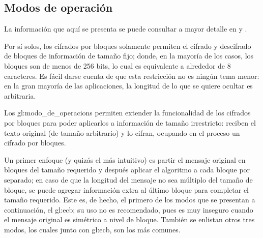 %
%

\subsection{Modos de operación}
\label{sec:modos}

La información que aquí se presenta se puede consultar a mayor detalle en
\cite{modos_de_operacion} y \cite{menezes}.

Por sí solos, los cifrados por bloques solamente permiten el cifrado y
descifrado de bloques de información de tamaño fijo; donde, en la mayoría de
los casos, los bloques son de menos de 256 bits, lo cual es equivalente a
alrededor de 8 caracteres. Es fácil darse cuenta de que esta restricción no es
ningún tema menor: en la gran mayoría de las aplicaciones, la longitud de lo
que se quiere ocultar es arbitraria.

Los \glspl{gl:modo_de_operacion} permiten extender la funcionalidad de los
cifrados por bloques para poder aplicarlos a información de tamaño irrestricto:
reciben el texto original (de tamaño arbitrario) y lo cifran, ocupando en el
proceso un cifrado por bloques.

Un primer enfoque (y quizás el más intuitivo) es partir el mensaje original
en bloques del tamaño requerido y después aplicar el algoritmo a cada bloque
por separado; en caso de que la longitud del mensaje no sea múltiplo del
tamaño de bloque, se puede agregar información extra al último bloque para
completar el tamaño requerido. Este es, de hecho, el primero de los modos que
se presentan a continuación, el \gls{gl:ecb}; su uso no es
recomendado, pues es muy inseguro cuando el mensaje original es simétrico a
nivel de bloque. También se enlistan otros tres modos, los cuales junto con
\gls{gl:ecb}, son los más comunes.






